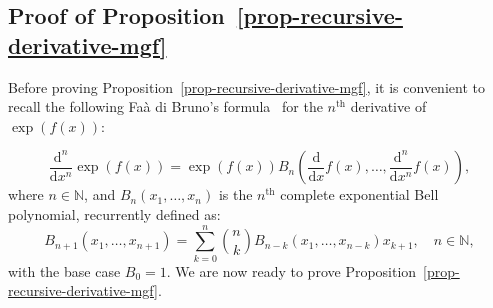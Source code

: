 \subsection{Proof of Proposition~\ref{prop-recursive-derivative-mgf}} \label{sec:prop-recursive-moment}


Before proving Proposition~\ref{prop-recursive-derivative-mgf}, it is convenient to recall the following Faà di Bruno's formula~\cite{faa_di_bruno_formula} for the $n^{\text{th}}$ derivative of $\exp(f(x))$:

\begin{equation}\label{eq-faa-di-bruno}
\frac{\mathrm{d}^{n}}{\mathrm{d}x^{n}} \exp(f(x)) = \exp(f(x)) B_{n}\left(\frac{\mathrm{d}}{\mathrm{d}x}f(x), \dots,\frac{\mathrm{d}^{n}}{\mathrm{d}x^{n}} f(x)\right),
\end{equation}
where $n \in \mathbb{N}$, and $B_{n}(x_1, \dots, x_n)$ is the $n^{\text{th}}$ complete exponential Bell polynomial, recurrently defined as:
\begin{equation}
\label{eq-bell-recursion}
B_{n+1}(x_1, \dots, x_{n+1}) = \sum_{k=0}^{n} \binom{n}{k} B_{n-k}(x_1, \dots, x_{n-k}) x_{k+1}, \quad n \in \mathbb{N},
\end{equation}
with the base case $B_0 = 1$. We are now ready to prove Proposition~\ref{prop-recursive-derivative-mgf}.

